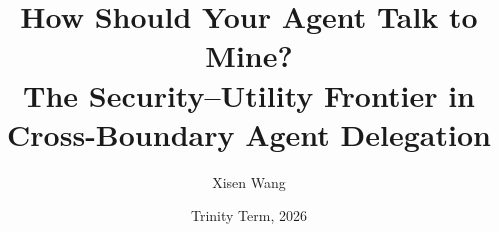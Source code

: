 \documentclass[report,11pt,review,oneside,leftmargin=20mm,bottommargin=20mm,font={Times New Roman},mathfont={STIX Two Math}]{oxengthesis}
\title       {How Should Your Agent Talk to Mine? \\ The Security--Utility Frontier in Cross-Boundary Agent Delegation}
\author      {Xisen Wang}
\date        {Trinity Term, 2026}
\begin{document}
\frontmatter
\makefrontmatterpages

\mainmatter















%

\appendix

%
%
%

\backmatter
\listofreferences
\end{document}
